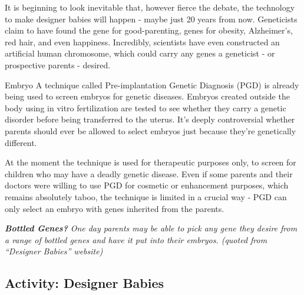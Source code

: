 \documentclass[
]{book}
\begin{document}
It is beginning to look inevitable that, however fierce the debate, the technology to make designer babies will happen - maybe just 20 years from now. Geneticists claim to have found the gene for good-parenting, genes for obesity, Alzheimer's, red hair, and even happiness. Incredibly, scientists have even constructed an artificial human chromosome, which could carry any genes a geneticist - or prospective parents - desired.

Embryo A technique called Pre-implantation Genetic Diagnosis (PGD) is already being used to screen embryos for genetic diseases. Embryos created outside the body using in vitro fertilization are tested to see whether they carry a genetic disorder before being transferred to the uterus. It's deeply controversial whether parents should ever be allowed to select embryos just because they're genetically different.

At the moment the technique is used for therapeutic purposes only, to screen for children who may have a deadly genetic disease. Even if some parents and their doctors were willing to use PGD for cosmetic or enhancement purposes, which remains absolutely taboo, the technique is limited in a crucial way - PGD can only select an embryo with genes inherited from the parents.

\textbf{\emph{Bottled Genes?}} \emph{One day parents may be able to pick any gene they desire from a range of bottled genes and have it put into their embryos. (quoted from ``Designer Babies'' website)}

\hypertarget{activity-designer-babies}{%
\subsection*{Activity: Designer Babies}\label{activity-designer-babies}}
\end{document}
